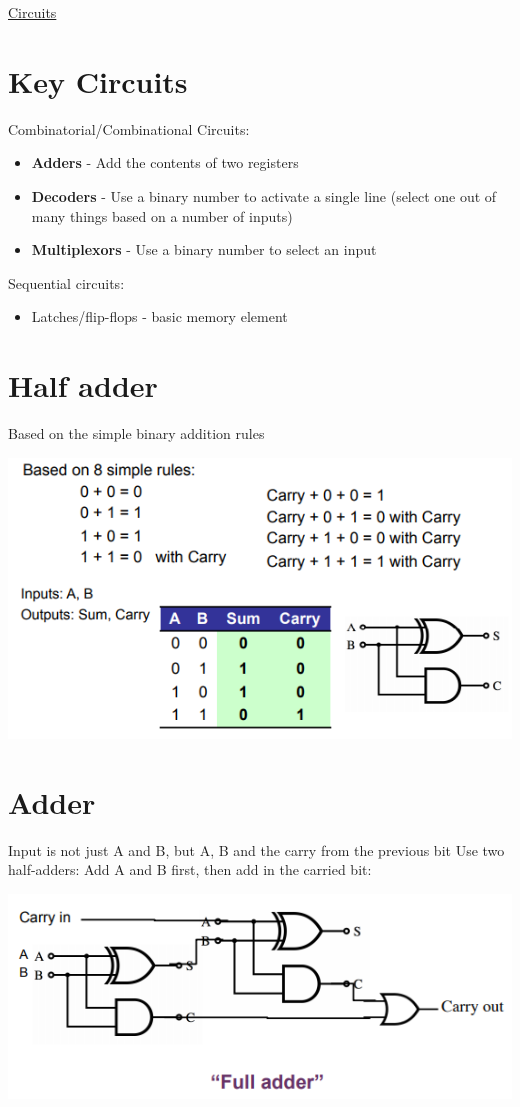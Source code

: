 \documentclass{article}[18pt]
\begin{document}
\begin{center}
\underline{\huge Circuits}
\end{center}
\section{Key Circuits}
Combinatorial/Combinational Circuits:
\begin{itemize}
	\item \textbf{Adders} - Add the contents of two registers
	\item \textbf{Decoders} - Use a binary number to activate a single line (select one out of many things based on a number of inputs)
	\item \textbf{Multiplexors} - Use a binary number to select an input
\end{itemize}
Sequential circuits:
\begin{itemize}
	\item Latches/flip-flops - basic memory element
\end{itemize}
\section{Half adder}
Based on the simple binary addition rules
\begin{center}
	\includegraphics[scale=0.7]{half_adder}
\end{center}

\section{Adder}
Input is not just A and B, but A, B and the carry from the previous bit
Use two half-adders: Add A and B first, then add in the carried bit: 
\begin{center}
	\includegraphics[scale=0.7]{adder}
\end{center}
\end{document}
